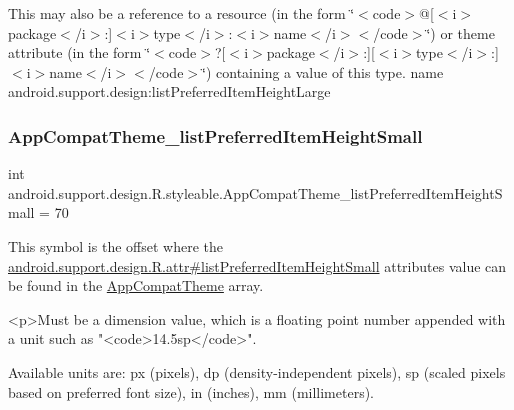 This may also be a reference to a resource (in the form \char`\"{}$<$code$>$@\mbox{[}$<$i$>$package$<$/i$>$\+:\mbox{]}$<$i$>$type$<$/i$>$\+:$<$i$>$name$<$/i$>$$<$/code$>$\char`\"{}) or theme attribute (in the form \char`\"{}$<$code$>$?\mbox{[}$<$i$>$package$<$/i$>$\+:\mbox{]}\mbox{[}$<$i$>$type$<$/i$>$\+:\mbox{]}$<$i$>$name$<$/i$>$$<$/code$>$\char`\"{}) containing a value of this type.  name android.\+support.\+design\+:list\+Preferred\+Item\+Height\+Large \mbox{\label{classandroid_1_1support_1_1design_1_1R_1_1styleable_a3fb383aca061541233e8348ffa9b12fc}} 
\subsubsection{\texorpdfstring{App\+Compat\+Theme\+\_\+list\+Preferred\+Item\+Height\+Small}{AppCompatTheme\_listPreferredItemHeightSmall}}
{\footnotesize\ttfamily int android.\+support.\+design.\+R.\+styleable.\+App\+Compat\+Theme\+\_\+list\+Preferred\+Item\+Height\+Small = 70\hspace{0.3cm}{\ttfamily [static]}}

This symbol is the offset where the \hyperlink{classandroid_1_1support_1_1design_1_1R_1_1attr_a8e453f1de1f5bad7dd2c255116542ce2}{android.\+support.\+design.\+R.\+attr\#list\+Preferred\+Item\+Height\+Small} attribute\textquotesingle{}s value can be found in the \hyperlink{classandroid_1_1support_1_1design_1_1R_1_1styleable_afb351dc8de20cbd4c89abe360373010c}{App\+Compat\+Theme} array.

\begin{DoxyVerb}      <p>Must be a dimension value, which is a floating point number appended with a unit such as "<code>14.5sp</code>".
\end{DoxyVerb}
 Available units are\+: px (pixels), dp (density-\/independent pixels), sp (scaled pixels based on preferred font size), in (inches), mm (millimeters). 

